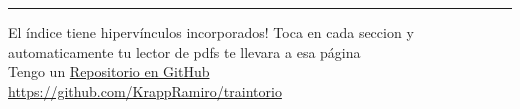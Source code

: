 \documentclass{article}
\begin{document}



\tableofcontents		\noindent\rule{\textwidth}{0.7pt }
El índice tiene hipervínculos incorporados!
Toca en cada seccion y automaticamente tu lector de pdfs te llevara a esa página
\\[12pt] %
{\large Tengo un
\href{https://github.com/KrappRamiro/traintorio}{Repositorio en GitHub}}\\
{\small \url{https://github.com/KrappRamiro/traintorio}}






\end{document}
